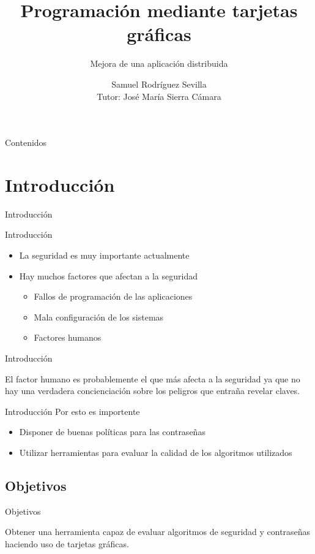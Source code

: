 \documentclass[12pt]{beamer}
\title{Programación mediante tarjetas gráficas}
\subtitle{Mejora de una aplicación distribuida}
\author{Samuel Rodríguez Sevilla\\Tutor: José María Sierra Cámara}
\newcommand{\mysection}[1]{\begin{frame}{}\begin{center}\Huge #1\end{center}\end{frame}}
\begin{document}
\frame{\titlepage}



\begin{frame}{Contenidos}
	\tableofcontents[pausesections]
\end{frame}

\section{Introducción}
\mysection{Introducción}
\begin{frame}{Introducción}
	\begin{itemize}
		\item La seguridad es muy importante actualmente
		\item Hay muchos factores que afectan a la seguridad
		\begin{itemize}
			\item Fallos de programación de las aplicaciones
			\item Mala configuración de los sistemas
			\item Factores humanos
		\end{itemize}
	\end{itemize}
\end{frame}

\begin{frame}{Introducción}
	\begin{center}
		El factor humano es probablemente el que más afecta a la seguridad ya que no hay una verdadera concienciación sobre los peligros que entraña revelar claves.
	\end{center}
\end{frame}

\begin{frame}{Introducción}
	Por esto es importente
	\pause
	\begin{itemize}
		\item Disponer de buenas políticas para las contraseñas
		\item Utilizar herramientas para evaluar la calidad de los algoritmos utilizados
	\end{itemize}
\end{frame}

\subsection{Objetivos}
\begin{frame}{Objetivos}
	\begin{center}
		Obtener una herramienta capaz de evaluar algoritmos de seguridad y contraseñas haciendo uso de tarjetas gráficas.
	\end{center}
\end{frame}
\end{document}
